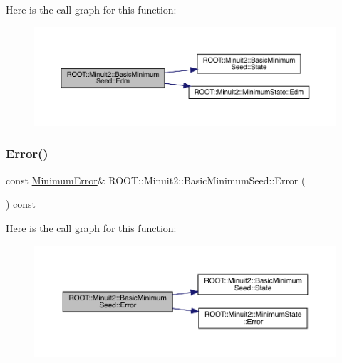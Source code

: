 Here is the call graph for this function\+:
\nopagebreak
\begin{figure}[H]
\begin{center}
\leavevmode
\includegraphics[width=350pt]{de/d50/classROOT_1_1Minuit2_1_1BasicMinimumSeed_a10659878d070bed73df23682eab3e88e_cgraph}
\end{center}
\end{figure}
\mbox{\label{classROOT_1_1Minuit2_1_1BasicMinimumSeed_a108de61cfe9f1766c3d7e251202a29df}} 
\subsubsection{\texorpdfstring{Error()}{Error()}\hspace{0.1cm}{\footnotesize\ttfamily [1/3]}}
{\footnotesize\ttfamily const \mbox{\hyperlink{classROOT_1_1Minuit2_1_1MinimumError}{Minimum\+Error}}\& R\+O\+O\+T\+::\+Minuit2\+::\+Basic\+Minimum\+Seed\+::\+Error (\begin{DoxyParamCaption}{ }\end{DoxyParamCaption}) const\hspace{0.3cm}{\ttfamily [inline]}}

Here is the call graph for this function\+:
\nopagebreak
\begin{figure}[H]
\begin{center}
\leavevmode
\includegraphics[width=350pt]{de/d50/classROOT_1_1Minuit2_1_1BasicMinimumSeed_a108de61cfe9f1766c3d7e251202a29df_cgraph}
\end{center}
\end{figure}
\mbox{\label{classROOT_1_1Minuit2_1_1BasicMinimumSeed_a108de61cfe9f1766c3d7e251202a29df}} 
